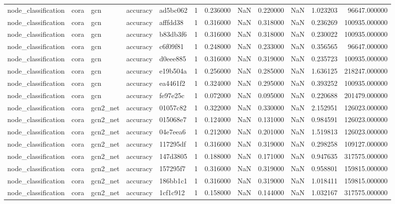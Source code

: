 \begin{tabular}{lllllrrrrrrr}
node_classification & cora & gcn & accuracy & ad5bc062 & 1 & 0.236000 & NaN & 0.220000 & NaN & 1.023203 & 96647.000000 \\
node_classification & cora & gcn & accuracy & afffdd38 & 1 & 0.316000 & NaN & 0.318000 & NaN & 0.236269 & 100935.000000 \\
node_classification & cora & gcn & accuracy & b83db3f6 & 1 & 0.316000 & NaN & 0.318000 & NaN & 0.230022 & 100935.000000 \\
node_classification & cora & gcn & accuracy & c6f09f81 & 1 & 0.248000 & NaN & 0.233000 & NaN & 0.356565 & 96647.000000 \\
node_classification & cora & gcn & accuracy & d0eee885 & 1 & 0.316000 & NaN & 0.319000 & NaN & 0.235723 & 100935.000000 \\
node_classification & cora & gcn & accuracy & e19b504a & 1 & 0.256000 & NaN & 0.285000 & NaN & 1.636125 & 218247.000000 \\
node_classification & cora & gcn & accuracy & ea4461f2 & 1 & 0.324000 & NaN & 0.295000 & NaN & 0.393252 & 100935.000000 \\
node_classification & cora & gcn & accuracy & fe97e25c & 1 & 0.072000 & NaN & 0.095000 & NaN & 0.220688 & 201479.000000 \\
node_classification & cora & gcn2_net & accuracy & 01057c82 & 1 & 0.322000 & NaN & 0.330000 & NaN & 2.152951 & 126023.000000 \\
node_classification & cora & gcn2_net & accuracy & 015068e7 & 1 & 0.124000 & NaN & 0.131000 & NaN & 0.984591 & 126023.000000 \\
node_classification & cora & gcn2_net & accuracy & 04e7eea6 & 1 & 0.212000 & NaN & 0.201000 & NaN & 1.519813 & 126023.000000 \\
node_classification & cora & gcn2_net & accuracy & 117295df & 1 & 0.316000 & NaN & 0.319000 & NaN & 0.298258 & 109127.000000 \\
node_classification & cora & gcn2_net & accuracy & 147d3805 & 1 & 0.188000 & NaN & 0.171000 & NaN & 0.947635 & 317575.000000 \\
node_classification & cora & gcn2_net & accuracy & 157295f7 & 1 & 0.316000 & NaN & 0.319000 & NaN & 0.958801 & 159815.000000 \\
node_classification & cora & gcn2_net & accuracy & 186bb1c1 & 1 & 0.316000 & NaN & 0.319000 & NaN & 1.018411 & 159815.000000 \\
node_classification & cora & gcn2_net & accuracy & 1cf1c912 & 1 & 0.158000 & NaN & 0.144000 & NaN & 1.032167 & 317575.000000 \\

\end{tabular}
